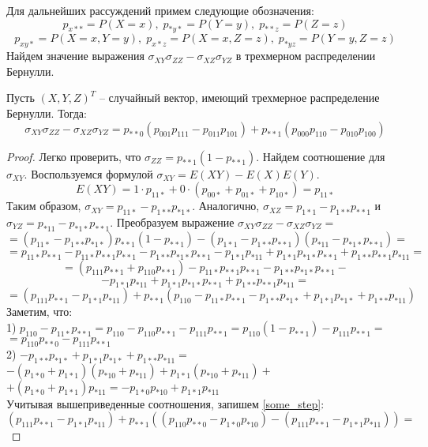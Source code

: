 Для дальнейших рассуждений примем следующие обозначения: 
$$p_{x**}=P(X=x), \; p_{*y*}=P(Y=y), \; p_{**z}=P(Z=z)$$ 
$$  p_{xy*}=P(X=x, Y=y),\; p_{x*z}=P(X=x, Z=z), \; p_{*yz}=P(Y=y, Z=z)$$
Найдем значение выражения $\sigma_{XY} \sigma_{ZZ} - \sigma_{XZ} \sigma_{YZ}$ в трехмерном распределении Бернулли.
\begin{lemma}\label{partial_cov}
    Пусть $(X,Y,Z)^T$ -- случайный вектор, имеющий трехмерное распределение Бернулли. Тогда:
    $$\sigma_{XY} \sigma_{ZZ} - \sigma_{XZ} \sigma_{YZ} = p_{**0}(p_{001}p_{111}-p_{011}p_{101}) + p_{**1} (p_{000}p_{110}-p_{010}p_{100})$$
\end{lemma}
\begin{proof}
    Легко проверить, что $\sigma_{ZZ}= p_{**1}(1-p_{**1})$. Найдем соотношение для $\sigma_{XY}$. Воспользуемся формулой $\sigma_{XY}=E(X Y)-E(X)E(Y)$.
    $$E(X Y) = 1 \cdot p_{11*} + 0 \cdot (p_{00*} + p_{01*} + p_{10*})=p_{11*}$$
    Таким образом, $\sigma_{XY}=p_{11*}-p_{1**}p_{*1*}$. Аналогично, $\sigma_{XZ}=p_{1*1}-p_{1**}p_{**1}$ и $\sigma_{YZ}=p_{*11}-p_{*1*}p_{**1}$.
    Преобразуем выражение $\sigma_{XY} \sigma_{ZZ} - \sigma_{XZ} \sigma_{YZ} =$
    $$
        = (p_{11*}-p_{1**}p_{*1*}) p_{**1}(1-p_{**1})
        -(p_{1*1}-p_{1**}p_{**1})(p_{*11}-p_{*1*}p_{**1})=
    $$
    $$
        = p_{11*}p_{**1} - p_{11*}p_{**1}p_{**1} - p_{1**}p_{*1*}p_{**1} 
        -p_{1*1}p_{*11}+p_{1*1}p_{*1*}p_{**1}+p_{1**}p_{**1}p_{*11} =
    $$
    $$
        =(p_{111}p_{**1}+p_{110}p_{**1}) - p_{11*}p_{**1}p_{**1} - p_{1**}p_{*1*}p_{**1} -
    $$ $$
        -p_{1*1}p_{*11}+p_{1*1}p_{*1*}p_{**1}+p_{1**}p_{**1}p_{*11}=
    $$
    \begin{equation}\label{some_step}
        =(p_{111}p_{**1}-p_{1*1}p_{*11})+p_{**1}(p_{110}-p_{11*}p_{**1} - p_{1**}p_{*1*} + p_{1*1}p_{*1*} + p_{1**}p_{*11})
    \end{equation}
    Заметим, что:\\
    1) $
        p_{110}-p_{11*}p_{**1}=p_{110}-p_{110}p_{**1}-p_{111}p_{**1}=
        p_{110}(1-p_{**1})-p_{111}p_{**1}=
    $
    $ 
        =p_{110}p_{**0}-p_{111}p_{**1}
    $\\
    2) $
        -p_{1**}p_{*1*} + p_{1*1}p_{*1*} + p_{1**}p_{*11}=
    $
    $
        -(p_{1*0}+p_{1*1})(p_{*10}+p_{*11})+p_{1*1}(p_{*10}+p_{*11}) + $
        $+(p_{1*0}+p_{1*1})p_{*11}=
        -p_{1*0}p_{*10}+p_{1*1}p_{*11}
    $\\
    Учитывая вышеприведенные соотношения, запишем \eqref{some_step}:
    $$
    (p_{111}p_{**1}-p_{1*1}p_{*11})+p_{**1}((p_{110}p_{**0}-p_{1*0}p_{*10})-(p_{111}p_{**1}-p_{1*1}p_{*11}))=
$$
\end{proof}
